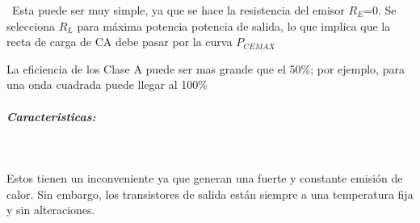 \documentclass[12pt,letterpaper]{article}
\begin{document}
\
Esta puede ser muy simple, ya que se hace la resistencia del emisor $R_E$=0. Se selecciona $R_L$ para máxima potencia potencia de salida, lo que implica que la recta de carga de CA debe pasar por la curva $P_{CEMAX}$

La eficiencia de los Clase A puede ser mas grande que el 50\%; por ejemplo, para una onda cuadrada puede llegar al 100\%
\

\subparagraph{Caracteristicas:}

\

Estos tienen un inconveniente ya que generan una fuerte y constante emisión de calor. Sin embargo, los transistores de salida están siempre a una temperatura fija y sin alteraciones.




\
\end{document}
